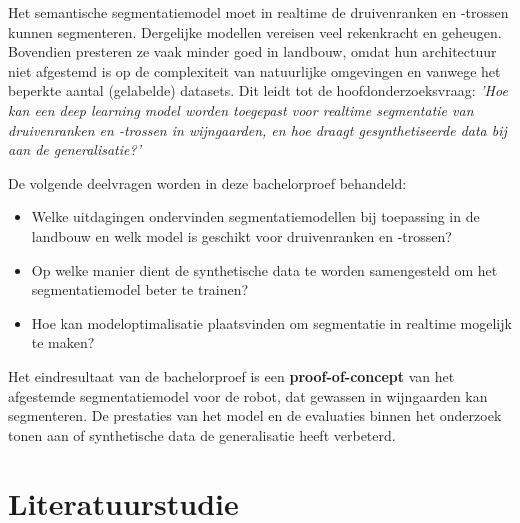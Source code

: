 Het semantische segmentatiemodel moet in realtime de druivenranken en -trossen kunnen segmenteren. Dergelijke modellen vereisen veel rekenkracht en geheugen. Bovendien presteren ze vaak minder goed in landbouw, omdat hun architectuur niet afgestemd is op de complexiteit van natuurlijke omgevingen en vanwege het beperkte aantal (gelabelde) datasets. Dit leidt tot de hoofdonderzoeksvraag: \emph{'Hoe kan een deep learning model worden toegepast voor realtime segmentatie van druivenranken en -trossen in wijngaarden, en hoe draagt gesynthetiseerde data bij aan de generalisatie?'}

De volgende deelvragen worden in deze bachelorproef behandeld:
\begin{itemize}
    \setlength{\itemsep}{0pt}
    \setlength{\parskip}{0pt} 
    \item Welke uitdagingen ondervinden segmentatiemodellen bij toepassing in de landbouw en welk model is geschikt voor druivenranken en -trossen?
    \item Op welke manier dient de synthetische data te worden samengesteld om het segmentatiemodel beter te trainen?
    \item Hoe kan modeloptimalisatie plaatsvinden om segmentatie in realtime mogelijk te maken?
\end{itemize}

Het eindresultaat van de bachelorproef is een \textbf{proof-of-concept} van het afgestemde segmentatiemodel voor de robot, dat gewassen in wijngaarden kan segmenteren. De prestaties van het model en de evaluaties binnen het onderzoek tonen aan of synthetische data de generalisatie heeft verbeterd.


\section{Literatuurstudie}%
\label{sec:literatuurstudie}

